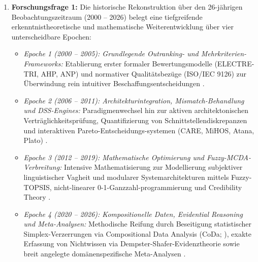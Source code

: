 \begin{enumerate}[label=\textbf{\arabic*.}, leftmargin=*]
  \item \textbf{Forschungsfrage 1:} Die historische Rekonstruktion über den 26-jährigen Beobachtungszeitraum (2000 -- 2026) belegt eine tiefgreifende erkenntnistheoretische und mathematische Weiterentwicklung über vier unterscheidbare Epochen:
  \begin{itemize}[leftmargin=*]
    \item \textit{Epoche 1 (2000 -- 2005): Grundlegende Outranking- und Mehrkriterien-Frameworks:} Etablierung erster formaler Bewertungsmodelle (ELECTRE-TRI, AHP, ANP) und normativer Qualitätsbezüge (ISO/IEC 9126) zur Überwindung rein intuitiver Beschaffungsentscheidungen \parencite{LZQJ6M4X, M3B2D3GD, FCYW9EWJ, DAU8NSK8}.
    \item \textit{Epoche 2 (2006 -- 2011): Architekturintegration, Mismatch-Behandlung und DSS-Engines:} Paradigmenwechsel hin zur aktiven architektonischen Verträglichkeitsprüfung, Quantifizierung von Schnittstellendiskrepanzen und interaktiven Pareto-Entscheidungs-systemen (CARE, MiHOS, Atana, Plato) \parencite{6RNULWVY, 9F79VAAB, MZ8JHDYA, 8VHUMEKY}.
    \item \textit{Epoche 3 (2012 -- 2019): Mathematische Optimierung und Fuzzy-MCDA-Verbreitung:} Intensive Mathematisierung zur Modellierung subjektiver linguistischer Vagheit und modularer Systemarchitekturen mittels Fuzzy-TOPSIS, nicht-linearer 0-1-Ganzzahl-programmierung und Credibility Theory \parencite{6YJHIVHG, VRTXHQI7, WZM7DUBY, B7ZTQCZZ, JX4RDRDU}.
    \item \textit{Epoche 4 (2020 -- 2026): Kompositionelle Daten, Evidential Reasoning und Meta-Analysen:} Methodische Reifung durch Beseitigung statistischer Simplex-Verzerrungen via Compositional Data Analysis (CoDa; \textcite{UK2X9C4W}), exakte Erfassung von Nichtwissen via Dempster-Shafer-Evidenztheorie \parencite{LNQHES84} sowie breit angelegte domänenspezifische Meta-Analysen \parencite{RRU375GB, LPC92LAP}.
  \end{itemize}


\end{enumerate}
